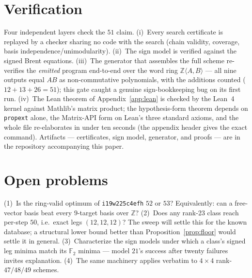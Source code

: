 \documentclass[11pt]{article}
\theoremstyle{definition}
\theoremstyle{remark}
\newcommand{\F}{\mathbb{F}}
\newcommand{\Z}{\mathbb{Z}}
\begin{document}
\section{Verification}\label{sec:verify}

Four independent layers check the $51$ claim.  (i)~Every search
certificate is replayed by a checker sharing no code with the search
(chain validity, coverage, basis independence/unimodularity).
(ii)~The sign model is verified against the signed Brent equations.
(iii)~The generator that assembles the full scheme re-verifies the
\emph{emitted} program end-to-end over the word ring
$\Z\langle A,B\rangle$ --- all nine outputs equal $AB$ as
non-commutative polynomials, with the additions counted
($12+13+26=51$); this gate caught a genuine sign-bookkeeping bug on
its first run.  (iv)~The Lean theorem of Appendix~\ref{app:lean} is
checked by the Lean~4 kernel against Mathlib's matrix product; the
hypothesis-form theorem depends on \texttt{propext} alone, the
Matrix-API form on Lean's three standard axioms, and the whole file
re-elaborates in under ten seconds (the appendix header gives the
exact command).  Artifacts --- certificates, sign model, generator,
and proofs --- are in the repository accompanying this paper.

\section{Open problems}\label{sec:open}

(1)~Is the ring-valid optimum of \texttt{i19w225c4efh} $52$ or $53$?
Equivalently: can a free-vector basis beat every $9$-target basis over
$\Z$?  (2)~Does any rank-23 class reach per-step $50$, i.e.\ exact
legs $(12,12,12)$?  The sweep will settle this for the known database;
a structural lower bound better than Proposition~\ref{prop:floor}
would settle it in general.  (3)~Characterize the sign models under
which a class's signed leg minima match its $\F_2$ minima --- model
$21$'s success after twenty failures invites explanation.  (4)~The
same machinery applies verbatim to $4\times4$ rank-$47/48/49$ schemes.
\end{document}
